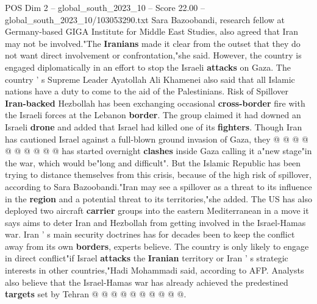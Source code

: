 \begin{textsample}{POS Dim 2 – global\_south\_2023\_10 – Score 22.00 – global\_south\_2023\_10/103053290.txt}
Sara Bazoobandi, research fellow at Germany-based GIGA Institute for Middle East Studies, also agreed that Iran may not be involved."The \textbf{Iranians} made it clear from the outset that they do not want direct involvement or confrontation,"she said.
However, the country is engaged diplomatically in an effort to stop the Israeli \textbf{attacks} on Gaza.
The country ' s Supreme Leader Ayatollah Ali Khamenei also said that all Islamic nations have a duty to come to the aid of the Palestinians.
Risk of Spillover \textbf{Iran-backed} Hezbollah has been exchanging occasional \textbf{cross-border} fire with the Israeli forces at the Lebanon \textbf{border}.
The group claimed it had downed an Israeli \textbf{drone} and added that Israel had killed one of its \textbf{fighters}.
Though Iran has cautioned Israel against a full-blown ground invasion of Gaza, they @ @ @ @ @ @ @ @ @ @ has started overnight \textbf{clashes} inside Gaza calling it a"new stage"in the war, which would be"long and difficult".
But the Islamic Republic has been trying to distance themselves from this crisis, because of the high risk of spillover, according to Sara Bazoobandi."Iran may see a spillover as a threat to its influence in the \textbf{region} and a potential threat to its territories,"she added.
The US has also deployed two aircraft \textbf{carrier} groups into the eastern Mediterranean in a move it says aims to deter Iran and Hezbollah from getting involved in the Israel-Hamas war.
Iran ' s main security doctrines has for decades been to keep the conflict away from its own \textbf{borders}, experts believe.
The country is only likely to engage in direct conflict"if Israel \textbf{attacks} the \textbf{Iranian} territory or Iran ' s strategic interests in other countries,"Hadi Mohammadi said, according to AFP.
Analysts also believe that the Israel-Hamas war has already achieved the predestined \textbf{targets} set by Tehran @ @ @ @ @ @ @ @ @ @.

\end{textsample}
